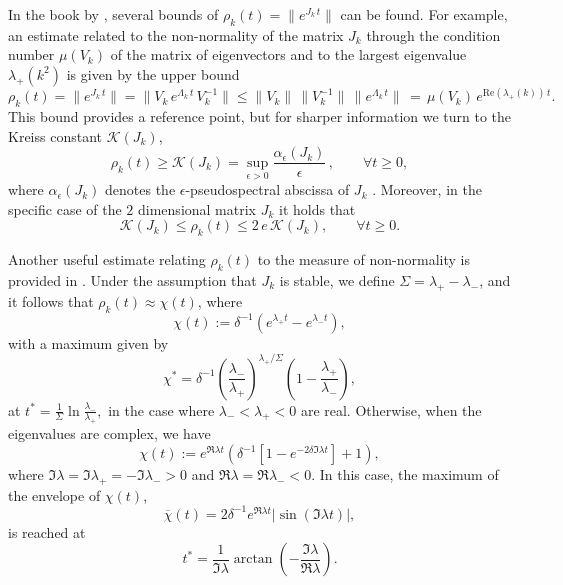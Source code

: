 \documentclass{article}
\newcommand{\jac}{J_{k}}
\begin{document}
 In the book by \cite{trefethen2005spectra}, several bounds of $\rho_{k}(t)=\|e^{\jac \, t}\|$ can be found. For example, an estimate related to the non-normality of the matrix $\jac$ through the condition number $\mu(V_{k})$ of the matrix of eigenvectors and to the largest eigenvalue   $\lambda_+(k^2)$ is given by the upper bound
\[
\rho_{k}(t) =  \|e^{\jac \, t} \| = \|V_{k}\, e^{\Lambda_{k}\, t} \, V_{k}^{-1}\| \leq \|V_{k}\|\, \| V_{k}^{-1}\| \, \|e^{\Lambda_{k}\, t}\| \,=\, \mu(V_{k}) \, e^{\mathrm{Re}(\lambda_+({k}))\, t}.
\]
This bound provides a reference point, but for sharper information we turn to the Kreiss constant $\mathcal{K}(\jac)$,
\begin{equation}\label{kreiss}
    \rho_{k}(t) \geq \mathcal{K} (\jac)=\sup_{\epsilon >0}\frac{\alpha_\epsilon (\jac)}{\epsilon}\, ,
\quad \quad \forall t\geq 0,
\end{equation}
where $\alpha_\epsilon(\jac)$ denotes the $\epsilon$-pseudospectral abscissa of $\jac$ \cite{trefethen2005spectra}. Moreover, in the specific case of {the} $2$ dimensional matrix $\jac$ it holds that
$$
\mathcal{K} (\jac) \leq \rho_{k}(t) \leq 2\, e  \, \mathcal{K} (\jac), \quad \quad \forall t\geq 0.
$$


 Another useful estimate relating \(\rho_{k}(t)\) to the measure of non-normality is provided in \cite{klika2017significance}. Under the assumption that \(\jac\) is stable, we define \(\Sigma = \lambda_+ - \lambda_-\), and it follows that \(\rho_{k}(t) \approx \chi(t)\), where 
\begin{equation}\label{eq:chi_real}
   \chi(t) := \delta^{-1} \left(e^{\lambda_+ t} - e^{\lambda_- t}\right), 
\end{equation}
with a maximum given by
\begin{equation}\label{eq:max_chi_real}
\chi^* = \delta^{-1} \left(\frac{\lambda_-}{\lambda_+}\right)^{\lambda_+ / \Sigma} \left(1 - \frac{\lambda_+}{\lambda_-}\right),
\end{equation}
at 
$
t^* = \frac{1}{\Sigma} \ln \frac{\lambda_-}{\lambda_+},
$
in the case where \(\lambda_- < \lambda_+ <0\) are real. Otherwise, when the eigenvalues are complex, we have
\[
\chi(t) := e^{\Re\lambda t} \left( \delta^{-1} \left[ 1 - e^{-2 \delta \Im\lambda t} \right] + 1 \right),
\]
where \(\Im\lambda = \Im\lambda_+ = -\Im\lambda_- > 0\) and \(\Re\lambda = \Re\lambda_- < 0\). In this case, the maximum of the envelope of \(\chi(t)\),
\[
\overline{\chi}(t) = 2 \delta^{-1} e^{\Re\lambda t} \lvert \sin(\Im\lambda t) \rvert,
\]
is reached at
\[
t^* = \frac{1}{\Im\lambda} \arctan\left(-\frac{\Im\lambda}{\Re\lambda}\right).
\]
\end{document}
